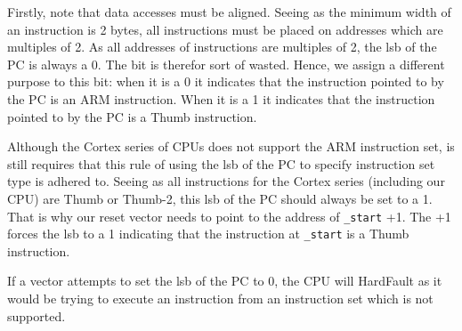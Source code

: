 Firstly, note that data accesses must be aligned. Seeing as the minimum width of an instruction is 2 bytes, all instructions must be placed on  addresses which are multiples of 2. As all addresses of instructions are multiples of 2, the lsb of the PC is always a 0. The bit is therefor sort of wasted. Hence, we assign a different purpose to this bit: when it is a 0 it indicates that the instruction pointed to by the PC is an ARM instruction. When it is a 1 it indicates that the instruction pointed to by the PC is a Thumb instruction. 

Although the Cortex series of CPUs does not support the ARM instruction set, is still requires that this rule of using the lsb of the PC to specify instruction set type is adhered to. Seeing as all instructions for the Cortex series (including our CPU) are Thumb or Thumb-2, this lsb of the PC should always be set to a 1. That is why our reset vector needs to point to the address of \texttt{\_start} +1. The +1 forces the lsb to a 1 indicating that the instruction at \texttt{\_start} is a Thumb instruction. 

If a vector attempts to set the lsb of the PC to 0, the CPU will HardFault as it would be trying to execute an instruction from an instruction set which is not supported. 
